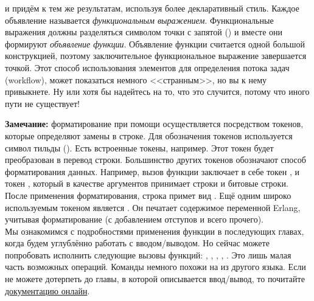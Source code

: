 и придём к тем же результатам, используя более декларативный стиль.
Каждое объявление  называется \emph{функциональным выражением}.
Функциональные выражения должны разделяться символом точки с запятой (\ops{;}) и вместе они формируют \emph{объявление функции}.
Объявление функции считается одной большой конструкцией, поэтому заключительное функциональное выражение завершается точкой.
Этот способ использования элементов для определения потока задач (workflow), может показаться немного <<странным>>, но вы к нему привыкнете.
Ну или хотя бы надейтесь на то, что это случится, потому что иного пути не существует!\\
\colorbox{lgray}
{
    \begin{minipage}{1\linewidth}
        \textbf{Замечание:} форматирование при помощи  осуществляется посредством токенов, которые определяют замены в строке.
        Для обозначения токенов используется символ тильды (\ops{\strut\mytilde}).
        Есть встроенные токены, например.
        Этот токен будет преобразован в перевод строки.
        Большинство других токенов обозначают способ форматирования данных.
        Например, вызов функции  заключает в себе токен , и токен , который в качестве аргументов принимает строки и битовые строки.
        После применения форматирования, строка примет вид .
        Ещё одним широко используемым токеном является .
        Он печатает содержимое переменной Erlang, учитывая форматирование (с добавлением отступов и всего прочего).\\ 
        Мы ознакомимся с подробностями применения функции  в последующих главах, когда будем углублённо работать с вводом/выводом.
        Но сейчас можете попробовать исполнить следующие вызовы функций: , , , , .
        Это лишь малая часть возможных операций.
        Команды немного похожи на  из другого языка.
        Если не можете дотерпеть до главы, в которой описывается ввод/вывод, то почитайте \href{http://erlang.org/doc/man/io.html\#format-3}{документацию онлайн}.
    \end{minipage}
}

